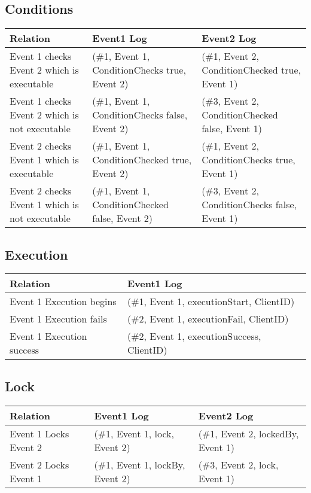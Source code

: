 \subsection{Conditions}
\begin{tabularx}{\linewidth}{ | X | X | X | }
  \hline
  Relation & Event1 Log & Event2 Log \\
  \hline
  Event 1 checks Event 2 which is executable & (\#1, Event 1, ConditionChecks true, Event 2) & (\#1, Event 2, ConditionChecked true, Event 1) \\
  \hline
  Event 1 checks Event 2 which is not executable & (\#1, Event 1, ConditionChecks false, Event 2) & (\#3, Event 2, ConditionChecked false, Event 1) \\
  \hline
  Event 2 checks Event 1 which is executable & (\#1, Event 1, ConditionChecked true, Event 2) & (\#1, Event 2, ConditionChecks true, Event 1) \\
  \hline
  Event 2 checks Event 1 which is not executable & (\#1, Event 1, ConditionChecked false, Event 2) & (\#3, Event 2, ConditionChecks false, Event 1) \\
  \hline
\end{tabularx}

\subsection{Execution}
\begin{tabularx}{\linewidth}{ | X | X | }
  \hline
  Relation & Event1 Log \\
  \hline
  Event 1 Execution begins & (\#1, Event 1, executionStart, ClientID) \\
  \hline
  Event 1 Execution fails & (\#2, Event 1, executionFail, ClientID) \\
  \hline
  Event 1 Execution success & (\#2, Event 1, executionSuccess, ClientID) \\
  \hline
\end{tabularx}

\subsection{Lock}
\begin{tabularx}{\linewidth}{ | X | X | X | }
  \hline
  Relation & Event1 Log & Event2 Log \\
  \hline
  Event 1 Locks Event 2 & (\#1, Event 1, lock, Event 2) & (\#1, Event 2, lockedBy, Event 1) \\
  \hline
  Event 2 Locks Event 1 & (\#1, Event 1, lockBy, Event 2) & (\#3, Event 2, lock, Event 1) \\
  \hline
\end{tabularx}

